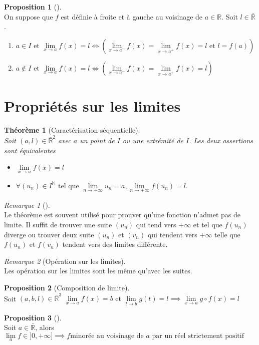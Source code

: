 \documentclass{article}
\newcommand{\R}{\mathbb{R}}
\newcommand{\N}{\mathbb{N}}
\newcommand{\et}{\text{ et }}
\newcommand{\tq}{\text{ tel que }}
\newcommand{\lm}{\lim\limits}
\newcommand{\voi}[1]{\text{ au voisinage de }#1}
\theoremstyle{definition}
\newtheorem*{prop}{Proposition}
\theoremstyle{remark}
\newtheorem*{rema}{Remarque}
\theoremstyle{plain}
\newtheorem*{them}{Théorème}
\newenvironment{prp}[1][]
{\begin{prop}[#1]\quad\\}
{\end{prop}}
\newenvironment{rem}[1][]
{\begin{rema}[#1]\quad\\}
{\end{rema}}
\newenvironment{thm}[1][]
{\begin{them}[#1]\quad\\}
{\end{them}}
\begin{document}
\begin{prp} 
On suppose que $f$ est définie à froite et à gauche au voisinage de
$a \in \R$. Soit $l \in \bar{\R}$.
\begin{enumerate}
    \item $a \in I \et \lm_{x \to a} f(x) = l \iff
    (\lm_{x \to a^-} f(x) = \lm_{x \to a^+} f(x) = l \et l = f(a))$
    \item $a \notin I \et \lm_{x \to a} f(x) = l \iff
    (\lm_{x \to a^-} f(x) = \lm_{x \to a^+} f(x) = l)$
\end{enumerate}
\end{prp}

\section{Propriétés sur les limites}
\begin{thm}[Caractérisation séquentielle]
Soit $(a, l) \in \bar{\R}^2$ avec $a$ un point de $I$ ou une extrémité
de $I$. Les deux assertions sont équivalentes
\begin{itemize}
    \item $\lm_{x \to a} f(x) = l$ 
    \item $\forall (u_n) \in I^\N \tq \lm_{n \to +\infty} u_n = a,
    \lm_{n \to +\infty} f(u_n) = l.$
\end{itemize}
\end{thm}

\begin{rem}
Le théorème est souvent utilisé pour prouver qu'une fonction n'admet pas
de limite.
Il suffit de trouver une suite $(u_n)$ qui tend vers $+\infty$ et tel
que $f(u_n)$ diverge ou trouver deux suite $(u_n)$ et $(v_n)$
qui tendent vers $+\infty$ telle que $f(u_n)$ et $f(v_n)$ tendent vers des
limites différente.
\end{rem}
 
\begin{rem}[Opération sur les limites]
Les opération sur les limites sont les même qu'avec les suites.
\end{rem}

\begin{prp}[Composition de limite] 
Soit $(a, b, l) \in \bar{\R}^3$
$\lm_{x \to a} f(x) = b \et \lm_{t \to b} g(t) = l
\implies \lm_{x \to a} g \circ f(x) = l$
\end{prp}

\begin{prp} 
Soit $a \in \bar{\R}$, alors
$\lm_{a} f \in ]0, +\infty] \implies f \text{minorée} \voi{a}
\text{ par un réel strictement positif}$
\end{prp}
\end{document}

